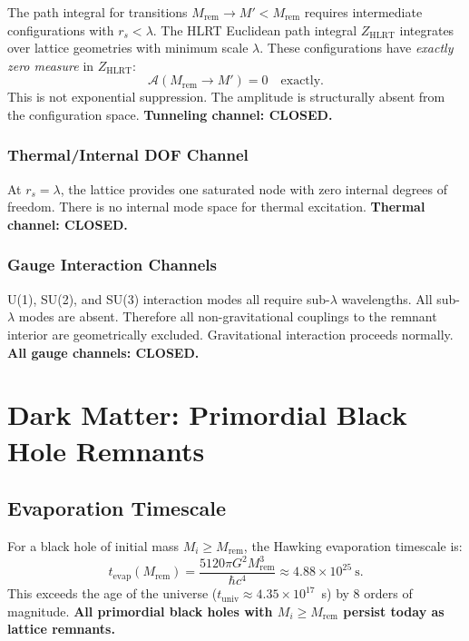 \documentclass[11pt,letterpaper]{article}
\begin{document}
The path integral for transitions $M_\mathrm{rem} \to M' < M_\mathrm{rem}$
requires intermediate configurations with $r_s < \lambda$.  The HLRT
Euclidean path integral $Z_\mathrm{HLRT}$ integrates over lattice
geometries with minimum scale $\lambda$.  These configurations have
\emph{exactly zero measure} in $Z_\mathrm{HLRT}$:
\begin{equation}
  \mathcal{A}(M_\mathrm{rem}\to M') = 0 \quad \text{exactly}.
\end{equation}
This is not exponential suppression.  The amplitude is structurally absent
from the configuration space.  \textbf{Tunneling channel: CLOSED.}

\subsubsection{Thermal/Internal DOF Channel}

At $r_s = \lambda$, the lattice provides one saturated node with zero
internal degrees of freedom.  There is no internal mode space for
thermal excitation.  \textbf{Thermal channel: CLOSED.}

\subsubsection{Gauge Interaction Channels}

U(1), SU(2), and SU(3) interaction modes all require sub-$\lambda$
wavelengths.  All sub-$\lambda$ modes are absent.  Therefore all
non-gravitational couplings to the remnant interior are geometrically
excluded.  Gravitational interaction proceeds normally.
\textbf{All gauge channels: CLOSED.}

\section{Dark Matter: Primordial Black Hole Remnants}

\subsection{Evaporation Timescale}

For a black hole of initial mass $M_i \geq M_\mathrm{rem}$, the Hawking
evaporation timescale is:
\begin{equation}
  t_\mathrm{evap}(M_\mathrm{rem})
  = \frac{5120\pi G^2 M_\mathrm{rem}^3}{\hbar c^4}
  \approx 4.88\times10^{25}~\text{s}.
\end{equation}
This exceeds the age of the universe
($t_\mathrm{univ}\approx4.35\times10^{17}$~s) by 8 orders of magnitude.
\textbf{All primordial black holes with $M_i \geq M_\mathrm{rem}$ persist today
as lattice remnants.}
\end{document}
